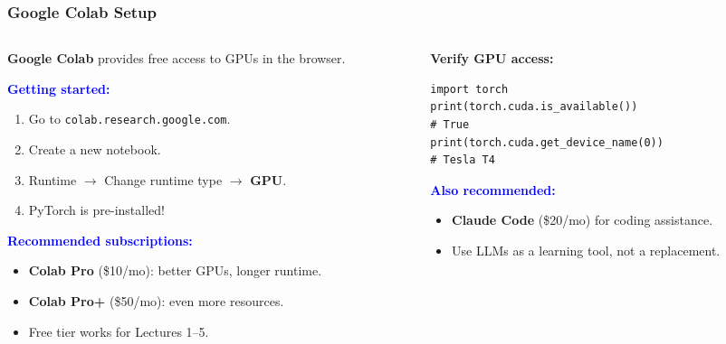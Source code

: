 \documentclass[notes,11pt, aspectratio=169]{beamer}
\begin{document}
\begin{frame}[fragile]
\frametitle{Google Colab Setup}

\begin{columns}[T]
\begin{column}{0.55\textwidth}
\textbf{Google Colab} provides free access to GPUs in the browser.

\vspace{6pt}
\textcolor{blue}{\textbf{Getting started:}}
\begin{enumerate}
    \item Go to \texttt{colab.research.google.com}.
    \item Create a new notebook.
    \item Runtime $\to$ Change runtime type $\to$ \textbf{GPU}.
    \item PyTorch is pre-installed!
\end{enumerate}

\vspace{6pt}
\textcolor{blue}{\textbf{Recommended subscriptions:}}
\begin{itemize}
    \item \textbf{Colab Pro} (\$10/mo): better GPUs, longer runtime.
    \item \textbf{Colab Pro+} (\$50/mo): even more resources.
    \item Free tier works for Lectures 1--5.
\end{itemize}
\end{column}

\begin{column}{0.42\textwidth}
\textbf{Verify GPU access:}

\vspace{4pt}
\begin{lstlisting}
import torch
print(torch.cuda.is_available())
# True
print(torch.cuda.get_device_name(0))
# Tesla T4
\end{lstlisting}

\vspace{6pt}
\textcolor{blue}{\textbf{Also recommended:}}
\begin{itemize}
    \item \textbf{Claude Code} (\$20/mo) for coding assistance.
    \item Use LLMs as a learning tool, not a replacement.
\end{itemize}
\end{column}
\end{columns}
\end{frame}
\end{document}
